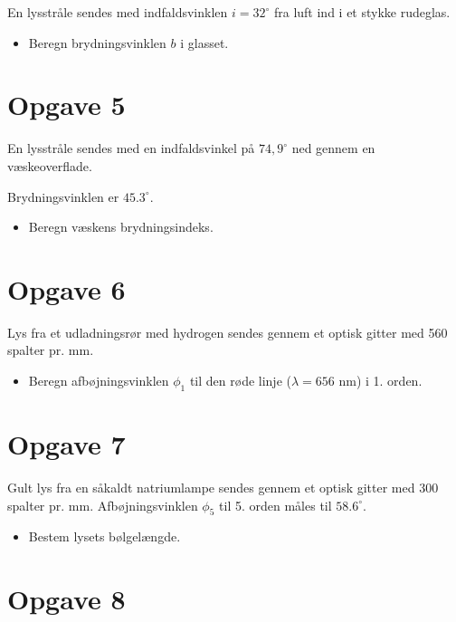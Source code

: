 \documentclass[a4paper, 12pt]{article}
\begin{document}
En lysstråle sendes med indfaldsvinklen \(i=32^{\circ}\) fra luft ind i et stykke rudeglas.

\begin{itemize}
\item Beregn brydningsvinklen \(b\) i glasset.
\end{itemize}

\section*{Opgave 5}
\label{sec:org1f820df}

En lysstråle sendes med en indfaldsvinkel på \(74,9^{\circ}\) ned gennem en væskeoverflade.

Brydningsvinklen er \(45.3^{\circ}\).

\begin{itemize}
\item Beregn væskens brydningsindeks.
\end{itemize}

\section*{Opgave 6}
\label{sec:org991d7a0}

Lys fra et udladningsrør med hydrogen sendes gennem et optisk gitter med 560 spalter pr. mm.

\begin{itemize}
\item Beregn afbøjningsvinklen \(\phi_1\) til den røde linje (\(\lambda = 656\) nm) i 1. orden.
\end{itemize}

\section*{Opgave 7}
\label{sec:org58dac61}

Gult lys fra en såkaldt natriumlampe sendes gennem et optisk gitter med 300 spalter pr. mm. Afbøjningsvinklen \(\phi_5\) til 5. orden måles til \(58.6^{\circ}\).

\begin{itemize}
\item Bestem lysets bølgelængde.
\end{itemize}

\section*{Opgave 8}
\label{sec:orgdeea034}
\end{document}
